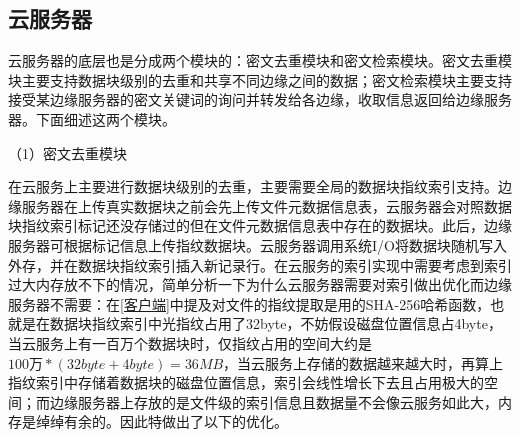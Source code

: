 \documentclass[promaster]{thesis-uestc}
\begin{document}
\subsection{云服务器}\label{云服务的实现}
云服务器的底层也是分成两个模块的：密文去重模块和密文检索模块。密文去重模块主要支持数据块级别的去重和共享不同边缘之间的数据；密文检索模块主要支持接受某边缘服务器的密文关键词的询问并转发给各边缘，收取信息返回给边缘服务器。下面细述这两个模块。

（1）密文去重模块

在云服务上主要进行数据块级别的去重，主要需要全局的数据块指纹索引支持。边缘服务器在上传真实数据块之前会先上传文件元数据信息表，云服务器会对照数据块指纹索引标记还没存储过的但在文件元数据信息表中存在的数据块。此后，边缘服务器可根据标记信息上传指纹数据块。云服务器调用系统I/O将数据块随机写入外存，并在数据块指纹索引插入新记录行。在云服务的索引实现中需要考虑到索引过大内存放不下的情况，简单分析一下为什么云服务器需要对索引做出优化而边缘服务器不需要：在\ref{客户端}中提及对文件的指纹提取是用的SHA-256哈希函数，也就是在数据块指纹索引中光指纹占用了32byte，不妨假设磁盘位置信息占4byte，当云服务上有一百万个数据块时，仅指纹占用的空间大约是$100万 * (32byte + 4byte) = 36MB$，当云服务上存储的数据越来越大时，再算上指纹索引中存储着数据块的磁盘位置信息，索引会线性增长下去且占用极大的空间；而边缘服务器上存放的是文件级的索引信息且数据量不会像云服务如此大，内存是绰绰有余的。因此特做出了以下的优化。
\end{document}
